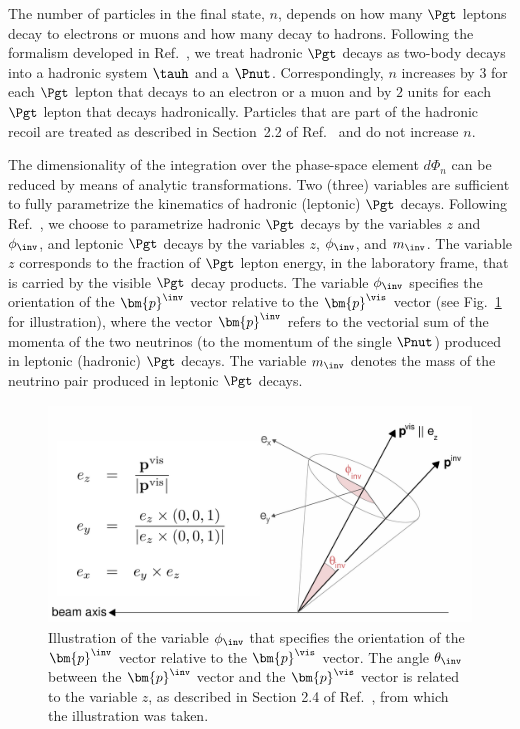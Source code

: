 The number of particles in the final state, $n$, depends on how many $\Pgt$ leptons decay to electrons or muons 
and how many decay to hadrons.
Following the formalism developed in Ref.~\cite{SVfitMEM}, 
we treat hadronic $\Pgt$ decays as two-body decays into a hadronic system $\tauh$ and a $\Pnut$.
Correspondingly, $n$ increases by $3$ for each $\Pgt$ lepton that decays to an electron or a muon
and by $2$ units for each $\Pgt$ lepton that decays hadronically.
Particles that are part of the hadronic recoil are treated as described in Section~2.2 of Ref.~\cite{SVfitMEM} 
and do not increase $n$.

The dimensionality of the integration over the phase-space element $d\Phi_{n}$ 
can be reduced by means of analytic transformations. 
Two (three) variables are sufficient to fully parametrize the kinematics of hadronic (leptonic) $\Pgt$ decays.
Following Ref.~\cite{SVfitMEM}, we choose to parametrize hadronic $\Pgt$ decays by the variables $z$ and $\phi_{\inv}$,
and leptonic $\Pgt$ decays by the variables $z$, $\phi_{\inv}$, and $m_{\inv}$.
The variable $z$ corresponds to the fraction of $\Pgt$ lepton energy, in the laboratory frame, that is carried by the visible $\Pgt$ decay products.
The variable $\phi_{\inv}$ specifies the orientation of the $\bm{p}^{\inv}$ vector relative to the $\bm{p}^{\vis}$ vector (see Fig.~\ref{fig:tauDecayParametrization} for illustration),
where the vector $\bm{p}^{\inv}$ refers to the vectorial sum of the momenta of the two neutrinos (to the momentum of the single $\Pnut$) produced in leptonic (hadronic) $\Pgt$ decays.
The variable $m_{\inv}$ denotes the mass of the neutrino pair produced in leptonic $\Pgt$ decays.

\begin{figure}[h]
\begin{center}
\includegraphics*[height=58mm]{figures/tauDecayParametrization.pdf}
\end{center}
\caption{
  Illustration of the variable $\phi_{\inv}$ that specifies the orientation of the $\bm{p}^{\inv}$ vector relative to the $\bm{p}^{\vis}$ vector.
  The angle $\theta_{\inv}$ between the $\bm{p}^{\inv}$ vector and the $\bm{p}^{\vis}$ vector is related to the variable $z$,
  as described in Section 2.4 of Ref.~\cite{SVfitMEM}, from which the illustration was taken.
}
\label{fig:tauDecayParametrization}
\end{figure} 


